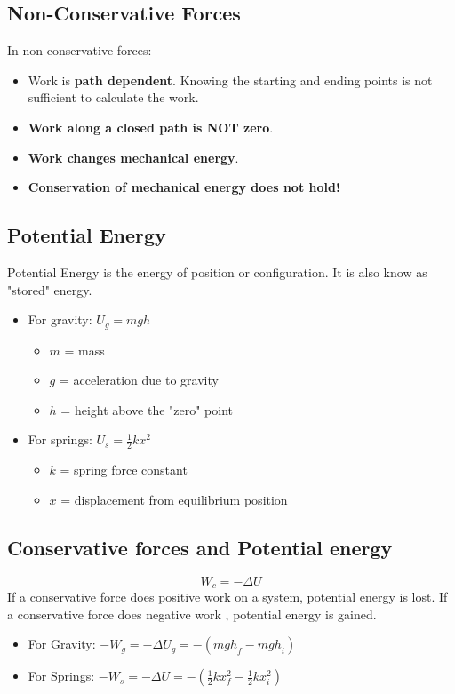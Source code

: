\subsection{Non-Conservative Forces}
In non-conservative forces:
\begin{itemize}
	\item Work is \textbf{path dependent}. Knowing the starting and ending points is not sufficient to calculate the work.
	\item \textbf{Work along a closed path is NOT zero}.
	\item \textbf{Work changes mechanical energy}.
	\item \textbf{Conservation of mechanical energy does not hold!}
\end{itemize}

\subsection{Potential Energy}
Potential Energy is the energy of position or configuration. It is also know as "stored" energy. 
\begin{itemize}
	\item For gravity: $U_g=mgh$
	\begin{itemize}
		\item $m$ = mass
		\item $g$ = acceleration due to gravity
		\item $h$ = height above the "zero" point
	\end{itemize}
	
	\item For springs: $U_s=\frac{1}{2}kx^2$
	\begin{itemize}
		\item $k$ = spring force constant
		\item $x$ = displacement from equilibrium position
	\end{itemize}
\end{itemize}

\subsection{Conservative forces and Potential energy}
\[W_c=-\Delta U\] If a conservative force does positive work on a system, potential energy is lost. If a conservative force does negative work , potential energy is gained.
\begin{itemize}
	\item For Gravity: $-W_g=-\Delta U_g=-({mgh}_f-{mgh}_i)$
	\item For Springs: $-W_s=-\Delta U=-(\frac{1}{2}kx_f^2-\frac{1}{2}kx_i^2)$
\end{itemize}
